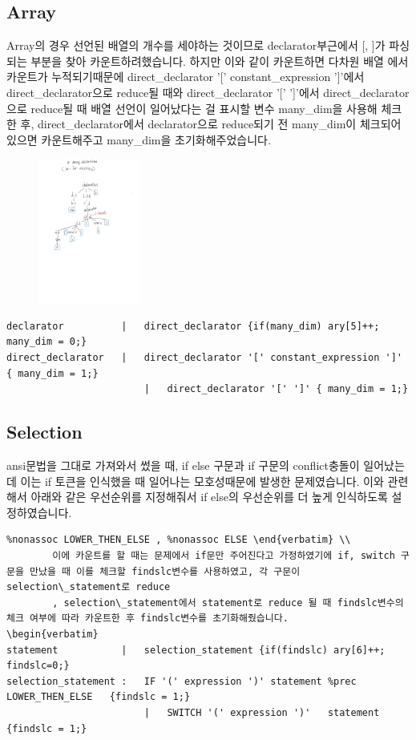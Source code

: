 \documentclass{article}
\begin{document}
    \subsection{Array}
        Array의 경우 선언된 배열의 개수를 세야하는 것이므로 declarator부근에서 [, ]가 파싱되는 부분을 찾아 카운트하려했습니다. 하지만 이와 같이 카운트하면 다차원 배열
        에서 카운트가 누적되기때문에 direct\_declarator '[' constant\_expression ']'에서 direct\_declarator으로 reduce될 때와 direct\_declarator '[' ']'에서 direct\_declarator으로 reduce될 때
        배열 선언이 일어났다는 걸 표시할 변수 many\_dim을 사용해 체크한 후, direct\_declarator에서 declarator으로 reduce되기 전 many\_dim이 체크되어있으면 카운트해주고 many\_dim을 초기화해주었습니다.\\
        \begin{figure}[h]
            \includegraphics[width = 0.3\textwidth]{ary.jpg}
        \end{figure}
\begin{verbatim}
declarator          |   direct_declarator {if(many_dim) ary[5]++; many_dim = 0;}
direct_declarator   |   direct_declarator '[' constant_expression ']' { many_dim = 1;}  
	                    |   direct_declarator '[' ']' { many_dim = 1;} 
\end{verbatim}
    \subsection{Selection}
        ansi문법을 그대로 가져와서 썼을 때, if else 구문과 if 구문의 conflict충돌이 일어났는데 이는 if 토큰을 인식했을 때 일어나는 모호성때문에 발생한 문제였습니다.
        이와 관련해서 아래와 같은 우선순위를 지정해줘서 if else의 우선순위를 더 높게 인식하도록 설정하였습니다.\begin{verbatim}%nonassoc LOWER_THEN_ELSE , %nonassoc ELSE \end{verbatim} \\
        이에 카운트를 할 때는 문제에서 if문만 주어진다고 가정하였기에 if, switch 구문을 만났을 때 이를 체크할 findslc변수를 사용하였고, 각 구문이 selection\_statement로 reduce
        , selection\_statement에서 statement로 reduce 될 때 findslc변수의 체크 여부에 따라 카운트한 후 findslc변수를 초기화해줬습니다.
\begin{verbatim}
statement           |   selection_statement {if(findslc) ary[6]++; findslc=0;}
selection_statement :   IF '(' expression ')' statement %prec LOWER_THEN_ELSE 	{findslc = 1;}
            	        |   SWITCH '(' expression ')'   statement {findslc = 1;}
\end{verbatim}
\end{document}
